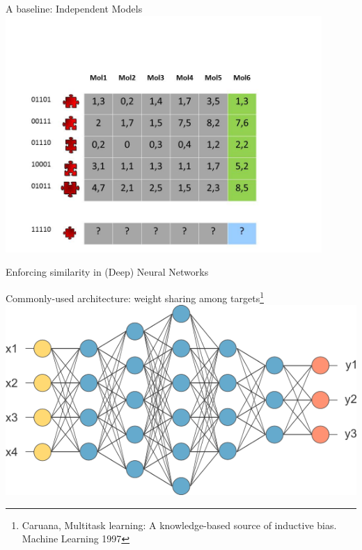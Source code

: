 \documentclass[]{beamer}
\begin{document}
\begin{frame}{A baseline: Independent Models}
\includegraphics[width=0.9\textwidth,trim = 0 0 100 100,clip]{Figures/pictures/Slide15}
\end{frame}










\begin{frame}{Enforcing similarity in (Deep) Neural Networks}
\begin{center}
Commonly-used architecture: weight sharing among targets\footnote{Caruana, Multitask learning: A knowledge-based source of inductive bias. Machine
Learning 1997} \\
\vspace{0.2cm}
\includegraphics[scale=0.6]{Figures/weightsharing}
\end{center}
\end{frame}
\end{document}
